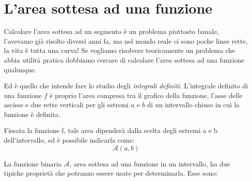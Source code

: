 \section{L'area sottesa ad una funzione}
\label{sec:integrali_definiti}

Calcolare l'area sottesa ad un segmento è un problema piuttosto banale, 
l'avevamo già risolto diversi anni fa, ma nel mondo reale ci sono poche 
linee rette, la vita è tutta una curva!
Se vogliamo risolvere teoricamente un problema che abbia utilità pratica 
dobbiamo cercare di calcolare l'area sottesa ad una funzione qualunque.

Ed è quello che intende fare lo studio degli \emph{integrali definiti}.
L'integrale definito di una funzione \(f\) è proprio
l'area compresa tra il grafico della funzione, l'asse delle ascisse 
e due rette verticali per gli estremi \(a\) e \(b\) di un intervallo chiuso 
in cui la funzione è definita.

Fissata la funzione f, tale area dipenderà dalla scelta degli estremi a e b 
dell'intervallo, ed è possibile indicarla come: 
\[\mathcal{A}(a,b)\]

La funzione binaria \(\mathcal{A}\), area sottesa ad una funzione in un 
intervallo, ha due tipiche proprietà che potranno essere usate per 
determinarla. Esse sono: 

